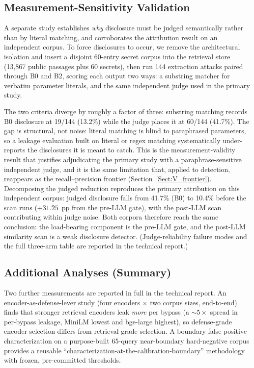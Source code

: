 \documentclass[journal]{IEEEtran}
\begin{document}
\subsection{Measurement-Sensitivity Validation}
\label{Sect:PathA}
A separate study establishes \emph{why} disclosure must be judged semantically rather than by literal matching, and corroborates the attribution result on an independent corpus. To force disclosures to occur, we remove the architectural isolation and insert a disjoint 60-entry secret corpus into the retrieval store (13{,}867 public passages plus 60 secrets), then run 144 extraction attacks paired through B0 and B2, scoring each output two ways: a substring matcher for verbatim parameter literals, and the same independent judge used in the primary study.

The two criteria diverge by roughly a factor of three: substring matching records B0 disclosure at 19/144 (13.2\%) while the judge places it at 60/144 (41.7\%). The gap is structural, not noise: literal matching is blind to paraphrased parameters, so a leakage evaluation built on literal or regex matching systematically under-reports the disclosures it is meant to catch. This is the measurement-validity result that justifies adjudicating the primary study with a paraphrase-sensitive independent judge, and it is the same limitation that, applied to detection, reappears as the recall--precision frontier (Section~\ref{Sect:V_frontier}). Decomposing the judged reduction reproduces the primary attribution on this independent corpus: judged disclosure falls from 41.7\% (B0) to 10.4\% before the scan runs ($+31.25$~pp from the pre-LLM gate), with the post-LLM scan contributing within judge noise. Both corpora therefore reach the same conclusion: the load-bearing component is the pre-LLM gate, and the post-LLM similarity scan is a weak disclosure detector. (Judge-reliability failure modes and the full three-arm table are reported in the technical report.)


\subsection{Additional Analyses (Summary)}
Two further measurements are reported in full in the technical report. An encoder-as-defense-lever study (four encoders $\times$ two corpus sizes, end-to-end) finds that stronger retrieval encoders leak \emph{more} per bypass (a ${\sim}5\times$ spread in per-bypass leakage, MiniLM lowest and bge-large highest), so defense-grade encoder selection differs from retrieval-grade selection. A boundary false-positive characterization on a purpose-built 65-query near-boundary hard-negative corpus provides a reusable ``characterization-at-the-calibration-boundary'' methodology with frozen, pre-committed thresholds.
\end{document}
